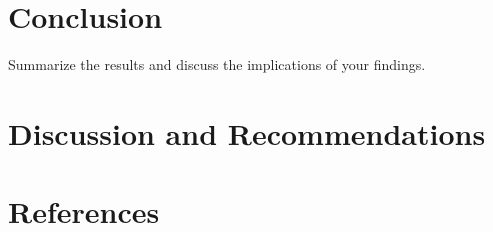 \documentclass[a4paper,12pt]{article}
\begin{document}
\section{Conclusion}
Summarize the results and discuss the implications of your findings.

\section{Discussion and Recommendations}

\section*{References}
\end{document}
